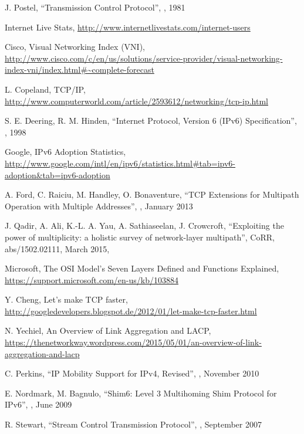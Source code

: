 \begin{thebibliography}{99}

J. Postel,
``Transmission Control Protocol'',
, 1981

Internet Live Stats,
\url{http://www.internetlivestats.com/internet-users}

Cisco, Visual Networking Index (VNI),
\url{http://www.cisco.com/c/en/us/solutions/service-provider/visual-networking-index-vni/index.html#~complete-forecast}

L. Copeland, TCP/IP,
\url{http://www.computerworld.com/article/2593612/networking/tcp-ip.html}

S. E. Deering, R. M. Hinden,
``Internet Protocol, Version 6 (IPv6) Specification'',
, 1998

Google, IPv6 Adoption Statistics,
\url{http://www.google.com/intl/en/ipv6/statistics.html#tab=ipv6-adoption&tab=ipv6-adoption}

A. Ford, C. Raiciu, M. Handley, O. Bonaventure,
``TCP Extensions for Multipath Operation with Multiple Addresses'',
, January 2013

J. Qadir, A. Ali, K.{-}L. A. Yau, A. Sathiaseelan, J. Crowcroft, 
``Exploiting the power of multiplicity: a holistic survey of network-layer multipath'',
CoRR,
abs/1502.02111,
March 2015,

Microsoft, The OSI Model's Seven Layers Defined and Functions Explained,
\url{https://support.microsoft.com/en-us/kb/103884}

Y. Cheng, Let's make TCP faster,
\url{http://googledevelopers.blogspot.de/2012/01/let-make-tcp-faster.html}

N. Yechiel, An Overview of Link Aggregation and LACP,
\url{https://thenetworkway.wordpress.com/2015/05/01/an-overview-of-link-aggregation-and-lacp}

C. Perkins,
``IP Mobility Support for IPv4, Revised'',
,  November 2010

E. Nordmark,  M. Bagnulo,
``Shim6: Level 3 Multihoming Shim Protocol for IPv6'',
,  June 2009

R. Stewart,
``Stream Control Transmission Protocol'',
,  September 2007


\end{thebibliography}
